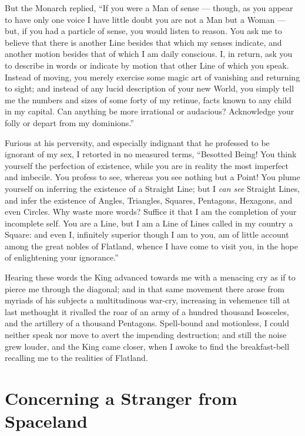 \documentclass[10pt, kindle, oneside]{kindle}
\begin{document}
But the Monarch replied, ``If you were a Man of sense --- though, as you appear
to have only one voice I have little doubt you are not a Man but a Woman ---
but, if you had a particle of sense, you would listen to reason. You ask me to
believe that there is another Line besides that which my senses indicate, and
another motion besides that of which I am daily conscious. I, in return, ask
you to describe in words or indicate by motion that other Line of which you
speak. Instead of moving, you merely exercise some magic art of vanishing and
returning to sight; and instead of any lucid description of your new World,
you simply tell me the numbers and sizes of some forty of my retinue, facts
known to any child in my capital. Can anything be more irrational or
audacious? Acknowledge your folly or depart from my dominions.''

Furious at his perversity, and especially indignant that he professed to be
ignorant of my sex, I retorted in no measured terms, ``Besotted Being! You
think yourself the perfection of existence, while you are in reality the most
imperfect and imbecile. You profess to see, whereas you see nothing but a
Point! You plume yourself on inferring the existence of a Straight Line; but I
\emph{can see} Straight Lines, and infer the existence of Angles, Triangles, Squares,
Pentagons, Hexagons, and even Circles. Why waste more words? Suffice it that I
am the completion of your incomplete self. You are a Line, but I am a Line of
Lines called in my country a Square: and even I, infinitely superior though I
am to you, am of little account among the great nobles of Flatland, whence I
have come to visit you, in the hope of enlightening your ignorance.''

Hearing these words the King advanced towards me with a menacing cry as if to
pierce me through the diagonal; and in that same movement there arose from
myriads of his subjects a multitudinous war-cry, increasing in vehemence till
at last methought it rivalled the roar of an army of a hundred thousand
Isosceles, and the artillery of a thousand Pentagons. Spell-bound and
motionless, I could neither speak nor move to avert the impending destruction;
and still the noise grew louder, and the King came closer, when I awoke to
find the breakfast-bell recalling me to the realities of Flatland.


\chapter{Concerning a Stranger from Spaceland}
\end{document}

